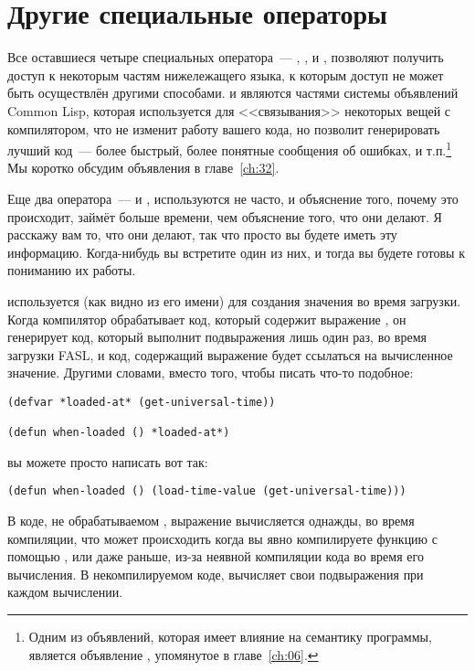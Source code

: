 \section{Другие специальные операторы}

Все оставшиеся четыре специальных оператора~--- , ,
 и , позволяют получить доступ к некоторым частям
нижележащего языка, к которым доступ не может быть осуществлён другими способами.
 и  являются частями системы объявлений Common Lisp, которая
используется для <<связывания>> некоторых вещей с компилятором, что не изменит работу
вашего кода, но позволит генерировать лучший код~--- более быстрый, более понятные
сообщения об ошибках, и т.п.\footnote{Одним из объявлений, которая имеет влияние на
  семантику программы, является объявление , упомянутое в главе~\ref{ch:06}.}
  Мы коротко обсудим объявления в главе~\ref{ch:32}.

Еще два оператора~---  и , используются не часто, и
объяснение того, почему это происходит, займёт больше времени, чем объяснение того, что
они делают. Я расскажу вам то, что они делают, так что просто вы будете иметь эту
информацию. Когда-нибудь вы встретите один из них, и тогда вы будете готовы к пониманию их
работы.

 используется (как видно из его имени) для создания значения во
время загрузки.  Когда компилятор обрабатывает код, который содержит выражение
, он генерирует код, который выполнит подвыражения лишь один раз, во
время загрузки FASL, и код, содержащий выражение  будет ссылаться на
вычисленное значение.  Другими словами, вместо того, чтобы писать что-то подобное:

\begin{lstlisting}
(defvar *loaded-at* (get-universal-time))

(defun when-loaded () *loaded-at*)
\end{lstlisting}

\noindent{}вы можете просто написать вот так:

\begin{lstlisting}
(defun when-loaded () (load-time-value (get-universal-time)))
\end{lstlisting}

В коде, не обрабатываемом , выражение 
вычисляется однажды, во время компиляции, что может происходить когда вы явно компилируете
функцию с помощью , или даже раньше, из-за неявной компиляции кода во время
его вычисления.  В некомпилируемом коде,  вычисляет свои
подвыражения при каждом вычислении.

